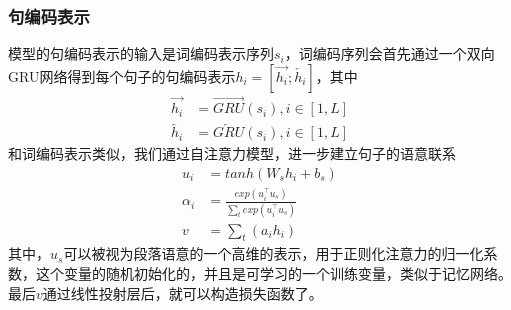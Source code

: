 \documentclass[twoside,a4paper,12pt]{book}%
\begin{document}
\subsubsection{句编码表示}
模型的句编码表示的输入是词编码表示序列$s_i$，词编码序列会首先通过一个双向\gls{GRU}网络得到每个句子的句编码表示$h_i=[\overrightarrow{h_{i}};\overleftarrow{h_{i}}]$，其中
$$
\begin{aligned}
\overrightarrow{h_{i}} &= \overrightarrow{GRU}(s_i),i\in [1,L]\\
\overleftarrow{h_{i}} &=\overleftarrow{GRU}(s_i),i\in [1,L]
\end{aligned}
$$
和词编码表示类似，我们通过自注意力模型，进一步建立句子的语意联系
$$
\begin{aligned}
u_{i} &= tanh(W_sh_{i} + b_s)\\
\alpha_{i} &= \frac{
	exp(u_{i}^\top u_s)
}{\sum_{t}exp(u_{i}^\top u_s)}\\
v &= \sum_{t}(a_{i}h_{i})  
\end{aligned}
$$
其中，$u_s$可以被视为段落语意的一个高维的表示，用于正则化注意力的归一化系数，这个变量的随机初始化的，并且是可学习的一个训练变量，类似于记忆网络。最后$v$通过线性投射层后，就可以构造损失函数了。
\end{document}
